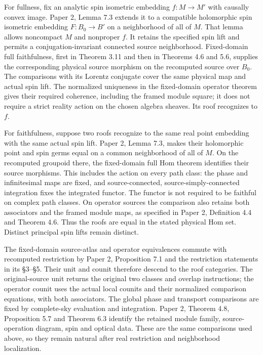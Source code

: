 \documentclass[
  english,
  11pt,
  reqno]{amsart}
\begin{document}
For fullness, fix an analytic spin isometric embedding \(f:M\to M'\)
with causally convex image. Paper 2, Lemma 7.3 extends it to a
compatible holomorphic spin isometric embedding \(F:B_0\to B'\) on a
neighborhood of all of \(M\). That lemma allows noncompact \(M\) and
nonproper \(f\). It retains the specified spin lift and permits a
conjugation-invariant connected source neighborhood. Fixed-domain full
faithfulness, first in Theorem 3.11 and then in Theorems 4.6 and 5.6,
supplies the corresponding physical source morphism on the recomputed
source over \(B_0\). The comparisons with its Lorentz conjugate cover
the same physical map and actual spin lift. The normalized uniqueness in
the fixed-domain operator theorem gives their required coherence,
including the framed module square; it does not require a strict reality
action on the chosen algebra sheaves. Its roof recognizes to \(f\).

For faithfulness, suppose two roofs recognize to the same real point
embedding with the same actual spin lift. Paper 2, Lemma 7.3, makes
their holomorphic point and spin germs equal on a common neighborhood of
all of \(M\). On the recomputed groupoid there, the fixed-domain full
Hom theorem identifies their source morphisms. This includes the action
on every path class: the phase and infinitesimal maps are fixed, and
source-connected, source-simply-connected integration fixes the
integrated functor. The functor is not required to be faithful on
complex path classes. On operator sources the comparison also retains
both associators and the framed module maps, as specified in Paper 2,
Definition 4.4 and Theorem 4.6. Thus the roofs are equal in the stated
physical Hom set. Distinct principal spin lifts remain distinct.

The fixed-domain source-atlas and operator equivalences commute with
recomputed restriction by Paper 2, Proposition 7.1 and the restriction
statements in its §3--§5. Their unit and counit therefore descend to the
roof categories. The original-source unit returns the original two
classes and overlap instructions; the operator counit uses the actual
local counits and their normalized comparison equations, with both
associators. The global phase and transport comparisons are fixed by
complete-sky evaluation and integration. Paper 2, Theorem 4.8,
Proposition 5.7 and Theorem 6.3 identify the retained module family,
source-operation diagram, spin and optical data. These are the same
comparisons used above, so they remain natural after real restriction
and neighborhood localization.
\end{document}
